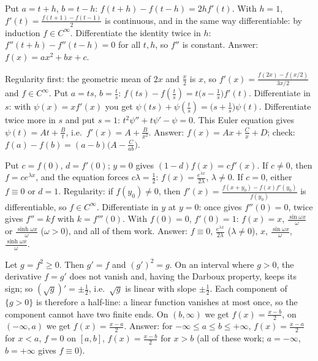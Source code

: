 \documentclass[11pt,a4paper]{article}
\begin{document}

 Put \(a=t+h\), \(b=t-h\): \(f(t+h)-f(t-h)=2hf'(t)\). With \(h=1\), \(f'(t)=\frac{f(t+1)-f(t-1)}2\) is continuous, and in the same way differentiable: by induction \(f\in C^\infty\).
 Differentiate the identity twice in \(h\): \(f''(t+h)-f''(t-h)=0\) for all \(t,h\), so \(f''\) is constant. Answer: \(f(x)=ax^2+bx+c\).

 Regularity first: the geometric mean of \(2x\) and \(\frac x2\) is \(x\), so \(f'(x)=\frac{f(2x)-f(x/2)}{3x/2}\) and \(f\in C^\infty\). Put \(a=ts\), \(b=\frac ts\): \(f(ts)-f(\frac ts)=t\bigl(s-\frac1s\bigr)f'(t)\).
 Differentiate in \(s\): with \(\psi(x)=xf'(x)\) you get \(\psi(ts)+\psi(\frac ts)=\bigl(s+\frac1s\bigr)\psi(t)\). Differentiate twice more in \(s\) and put \(s=1\): \(t^2\psi''+t\psi'-\psi=0\).
 This Euler equation gives \(\psi(t)=At+\frac Bt\), i.e.\ \(f'(x)=A+\frac B{x^2}\). Answer: \(f(x)=Ax+\frac Cx+D\); check: \(f(a)-f(b)=(a-b)\bigl(A-\frac C{ab}\bigr)\).

 Put \(c=f(0)\), \(d=f'(0)\); \(y=0\) gives \((1-d)f(x)=cf'(x)\). If \(c\ne0\), then \(f=ce^{\lambda x}\), and the equation forces \(c\lambda=\frac12\): \(f(x)=\frac{e^{\lambda x}}{2\lambda}\), \(\lambda\ne0\).
 If \(c=0\), either \(f\equiv0\) or \(d=1\). Regularity: if \(f(y_0)\ne0\), then \(f'(x)=\frac{f(x+y_0)-f(x)f'(y_0)}{f(y_0)}\) is differentiable, so \(f\in C^\infty\). Differentiate in \(y\) at \(y=0\): once gives \(f''(0)=0\), twice gives \(f''=kf\) with \(k=f'''(0)\).
 With \(f(0)=0\), \(f'(0)=1\): \(f(x)=x\), \(\frac{\sin\omega x}\omega\) or \(\frac{\sinh\omega x}\omega\) (\(\omega\gt0\)), and all of them work. Answer: \(f\equiv0\), \(\frac{e^{\lambda x}}{2\lambda}\) (\(\lambda\ne0\)), \(x\), \(\frac{\sin\omega x}\omega\), \(\frac{\sinh\omega x}\omega\).

 Let \(g=f^2\ge0\). Then \(g'=f\) and \((g')^2=g\). On an interval where \(g\gt0\), the derivative \(f=g'\) does not vanish and, having the Darboux property, keeps its sign; so \((\sqrt g)'=\pm\frac12\), i.e.\ \(\sqrt g\) is linear with slope \(\pm\frac12\).
 Each component of \(\{g\gt0\}\) is therefore a half-line: a linear function vanishes at most once, so the component cannot have two finite ends. On \((b,\infty)\) we get \(f(x)=\frac{x-b}2\), on \((-\infty,a)\) we get \(f(x)=\frac{x-a}2\).
 Answer: for \(-\infty\le a\le b\le+\infty\), \(f(x)=\frac{x-a}2\) for \(x\lt a\), \(f=0\) on \([a,b]\), \(f(x)=\frac{x-b}2\) for \(x\gt b\) (all of these work; \(a=-\infty\), \(b=+\infty\) gives \(f\equiv0\)).
\end{document}
